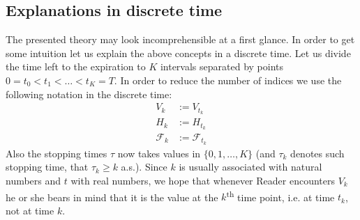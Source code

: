 \documentclass[a4paper,11pt, twoside]{book}
\theoremstyle{definition}
\theoremstyle{remark}
\begin{document}
\subsection{Explanations in discrete time}
The presented theory may look incomprehensible at a first glance. In order to get some intuition let us explain the above concepts in a discrete time. Let us divide the time left to the expiration to $K$ intervals separated by points $0 = t_0 < t_1 < \ldots < t_K = T$. In order to reduce the number of indices we use the following notation in the discrete time:
\begin{align*}
 V_k &:= V_{t_k} \\
 H_k &:= H_{t_k} \\
 \mathcal{F}_k &:= \mathcal{F}_{t_k}
\end{align*}
Also the stopping times $\tau$ now takes values in $\{0, 1, \ldots, K\}$ (and $\tau_k$ denotes such stopping time, that $\tau_k \geq k$ a.s.).
Since $k$ is usually associated with natural numbers and $t$ with real numbers, we hope that whenever Reader encounters $V_k$ he or she bears in mind that it is the value at the $k$\textsuperscript{th} time point, i.e. at time $t_k$, not at time $k$.
\end{document}
